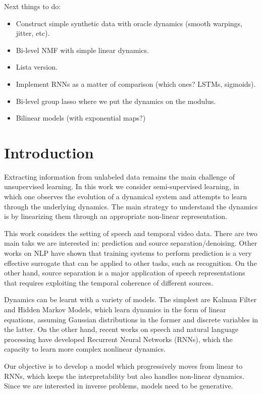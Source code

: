\documentclass[11pt]{article} %
\begin{document}
Next things to do:
\begin{itemize}
\item Construct simple synthetic data with oracle dynamics (smooth warpings, jitter, etc).
\item Bi-level NMF with simple linear dynamics.
\item Lista version.
\item Implement RNNs as a matter of comparison (which ones? LSTMs, sigmoids).
\item Bi-level group lasso where we put the dynamics on the modulus.
\item Bilinear models (with exponential maps?)
\end{itemize}




\section*{Introduction}

Extracting information from unlabeled data remains the main challenge of unsupervised learning. 
In this work we consider semi-supervised learning, in which one observes the evolution of a dynamical system 
and attempts to learn through the underlying dynamics. 
The main strategy to understand the dynamics is by linearizing them through an appropriate non-linear representation.

This work considers the setting of speech and temporal video data. 
There are two main taks we are interested in: prediction and source separation/denoising. 
Other works on NLP have shown that training systems to perform prediction is a very effective surrogate that 
can be applied to other tasks, such as recognition. On the other hand, source separation is a major application
of speech representations that requires exploiting the temporal coherence of different sources. 

Dynamics can be learnt with a variety of models. The simplest are Kalman Filter and Hidden Markov Models, which
learn dynamics in the form of linear equations, assuming Gaussian distributions in the former and discrete variables in the latter. 
On the other hand, recent works on speech and natural language processing have developed Recurrent Neural Networks (RNNs), 
which the capacity to learn more complex nonlinear dynamics. 

Our objective is to develop a model which progressively moves from linear to RNNs, which keeps the interpretability but also 
handles non-linear dynamics. 
Since we are interested in inverse problems, models need to be generative. 
\end{document}
